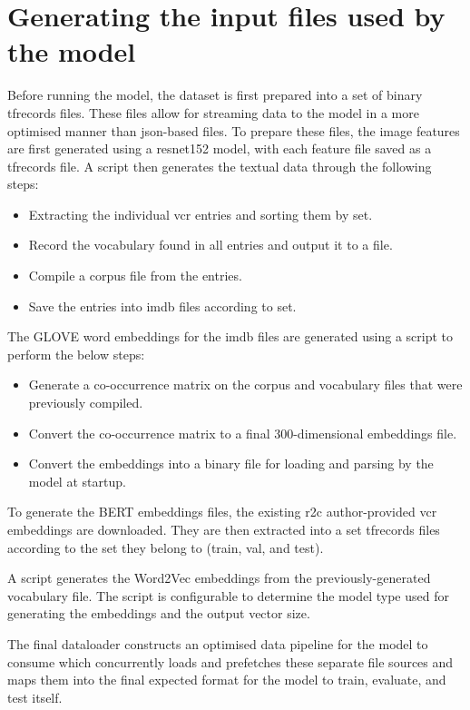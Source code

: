 \chapter{Generating the input files used by the model}
\label{chp:appendix_a}

Before running the model, the dataset is first prepared into a set of binary tfrecords files.
These files allow for streaming data to the model in a more optimised manner than json-based files.
To prepare these files, the image features are first generated using a \gls{resnet}152 model, with each feature file saved as a tfrecords file.
A script then generates the textual data through the following steps:
\begin{itemize}
    \item Extracting the individual \gls{vcr} entries and sorting them by set.
    \item Record the vocabulary found in all entries and output it to a file.
    \item Compile a corpus file from the entries.
    \item Save the entries into imdb files according to set.
\end{itemize}

The GLOVE word embeddings for the \gls{imdb} files are generated using a script to perform the below steps:
\begin{itemize}
    \item Generate a co-occurrence matrix on the \gls{corpus} and vocabulary files that were previously compiled.
    \item Convert the co-occurrence matrix to a final 300-dimensional embeddings file.
    \item Convert the embeddings into a binary file for loading and parsing by the model at startup.
\end{itemize}

To generate the BERT embeddings files, the existing \gls{r2c} author-provided \gls{vcr} embeddings are downloaded.
They are then extracted into a set tfrecords files according to the set they belong to (train, val, and test).

A script generates the Word2Vec embeddings from the previously-generated vocabulary file.
The script is configurable to determine the model type used for generating the embeddings and the output vector size.

The final dataloader constructs an optimised data pipeline for the model to consume which concurrently loads and prefetches these separate file sources and maps them into the final expected format for the model to train, evaluate, and test itself.

